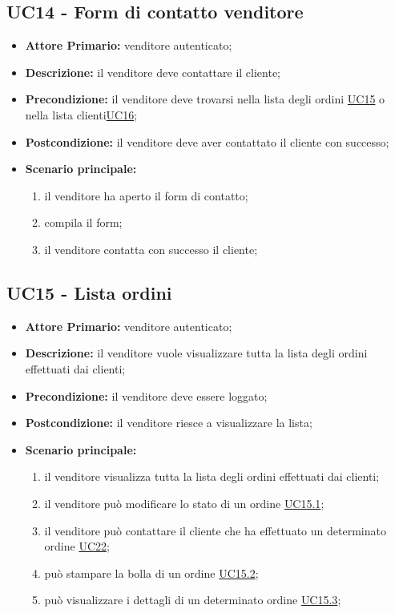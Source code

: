 \subsection{UC14 - Form di contatto venditore}
\label{UC14}
\begin{itemize}
    \item \textbf{Attore Primario:} venditore autenticato;
    \item \textbf{Descrizione:} il venditore deve contattare il cliente;
    \item \textbf{Precondizione:} il venditore deve trovarsi nella lista degli ordini \hyperref[UC15]{UC15} o nella lista clienti\hyperref[UC16]{UC16};
    \item \textbf{Postcondizione:} il venditore deve aver contattato il cliente con successo;
    \item \textbf{Scenario principale:}
    \begin{enumerate}
        \item il venditore ha aperto il form di contatto;
        \item compila il form;
        \item il venditore contatta con successo il cliente;
    \end{enumerate}
\end{itemize}

\subsection{UC15 - Lista ordini}
\label{UC15}
\begin{itemize}
    \item \textbf{Attore Primario:} venditore autenticato;
    \item \textbf{Descrizione:} il venditore vuole visualizzare tutta la lista degli ordini effettuati dai clienti;
    \item \textbf{Precondizione:} il venditore deve essere loggato;
    \item \textbf{Postcondizione:} il venditore riesce a visualizzare la lista;
    \item \textbf{Scenario principale:}
    \begin{enumerate}
        \item il venditore visualizza tutta la lista degli ordini effettuati dai clienti;
         \item il venditore può modificare lo stato di un ordine \hyperref[UC15.1]{UC15.1};
        \item il venditore può contattare il cliente che ha effettuato un determinato ordine \hyperref[UC22]{UC22};
        \item può stampare la bolla di un ordine \hyperref[UC15.2]{UC15.2};
        \item può visualizzare i dettagli di un determinato ordine \hyperref[UC15.3]{UC15.3}; 
    \end{enumerate}
\end{itemize}

